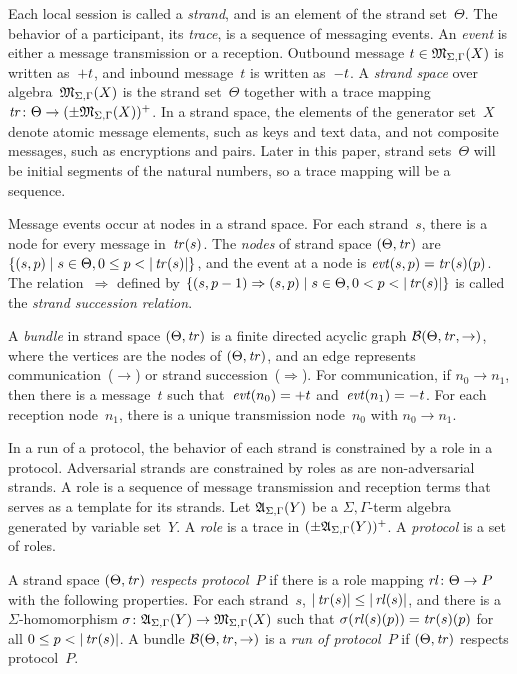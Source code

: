 \documentclass[12pt]{article}
\theoremstyle{definition}
\begin{document}
Each local session is called a \emph{strand}, and is an element of the
strand set~$\Theta$.  The behavior of a participant, its \emph{trace},
is a sequence of messaging events.  An \emph{event} is either a
message transmission or a reception.  Outbound message
$t\in\mathfrak M_{\Sigma,\Gamma}(X)$ is written as~$\mathord + t$, and
inbound message~$t$ is written as~$\mathord - t$.  A \emph{strand space}
over algebra~$\mathfrak M_{\Sigma,\Gamma}(X)$ is the strand set~$\Theta$
together with a trace mapping $\operatorname{\mathit{tr}}\colon\Theta\to
(\pm\mathfrak M_{\Sigma,\Gamma}(X))^+$.  In a strand space, the elements
of the generator set~$X$ denote atomic message elements, such as keys
and text data, and not composite messages, such as encryptions and
pairs.  Later in this paper, strand sets~$\Theta$ will be initial
segments of the natural numbers, so a trace mapping will be a
sequence.

Message events occur at nodes in a strand space.  For each strand~$s$,
there is a node for every message in~$\operatorname{\mathit{tr}}(s)$.  The \emph{nodes}
of strand space $(\Theta,\operatorname{\mathit{tr}})$ are $\{(s,p)\mid s\in\Theta, 0\leq
p < |\operatorname{\mathit{tr}}(s)|\}$, and the event at a node is
$\operatorname{\mathit{evt}}(s,p)=\operatorname{\mathit{tr}}(s)(p)$.  The relation~$\Rightarrow$ defined by
$\{(s,p-1)\Rightarrow(s,p)\mid s\in\Theta, 0<p<|\fn{tr}(s)|\}$ is
called the \emph{strand succession relation}.

A \emph{bundle} in strand space $(\Theta,\operatorname{\mathit{tr}})$ is a finite
directed acyclic graph $\mathcal{B}(\Theta,\operatorname{\mathit{tr}},\to)$, where the
vertices are the nodes of $(\Theta,\operatorname{\mathit{tr}})$, and an edge represents
communication~($\rightarrow$) or strand succession~($\Rightarrow$).
For communication, if $n_0\rightarrow n_1$, then there is a
message~$t$ such that~$\operatorname{\mathit{evt}}(n_0)=\mathord + t$
and~$\operatorname{\mathit{evt}}(n_1)=\mathord - t$.  For each reception node~$n_1$, there is
a unique transmission node~$n_0$ with $n_0\rightarrow n_1$.

In a run of a protocol, the behavior of each strand is constrained by
a role in a protocol.  Adversarial strands are constrained by
roles as are non-adversarial strands.
A role is a sequence of message transmission
and reception terms that serves as a template for its strands.  Let
$\mathfrak A_{\Sigma,\Gamma}(Y)$ be a $\Sigma,\Gamma$-term algebra
generated by variable set~$Y$.  A \emph{role} is a trace in
$(\pm\mathfrak A_{\Sigma,\Gamma}(Y))^+$.  A \emph{protocol} is a set of
roles.

A strand space $(\Theta,\operatorname{\mathit{tr}})$ \emph{respects protocol}~$P$ if
there is a role mapping $\operatorname{\mathit{rl}}\colon\Theta\to P$ with the following
properties.  For each strand~$s$, $|\operatorname{\mathit{tr}}(s)|\leq|\operatorname{\mathit{rl}}(s)|$, and
there is a $\Sigma$-homomorphism
$\sigma\colon\mathfrak A_{\Sigma,\Gamma}(Y)\rightarrow\mathfrak M_{\Sigma,\Gamma}(X)$
such that $\sigma(\operatorname{\mathit{rl}}(s)(p))=\operatorname{\mathit{tr}}(s)(p)$ for all $0\leq
p<|\fn{tr}(s)|$.  A bundle $\mathcal{B}(\Theta,\operatorname{\mathit{tr}},\to)$ is a
\emph{run of protocol}~$P$ if $(\Theta,\operatorname{\mathit{tr}})$ respects
protocol~$P$.
\end{document}
